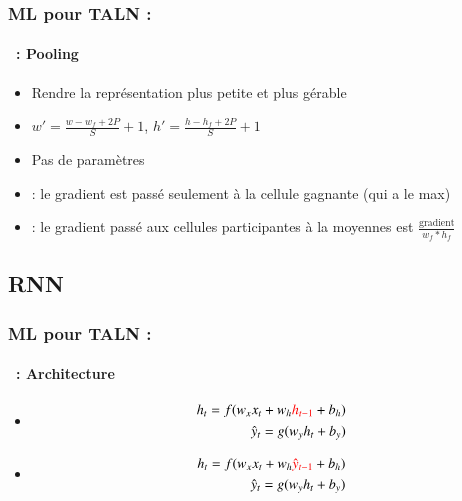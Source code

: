 \documentclass[xcolor=table]{beamer}
\begin{document}
\begin{frame}
	\frametitle{ML pour TALN : \insertsection}
	\framesubtitle{\insertsubsection\ : Pooling}
	
	\begin{minipage}{0.60\textwidth} 
		\begin{itemize}
			\item Rendre la représentation plus petite et plus gérable
			\item $ w' = \frac{w - w_f + 2P}{S} + 1$,  $ h' = \frac{h - h_f + 2P}{S} + 1$
			\item Pas de paramètres 
			\item {} : le gradient est passé seulement à la cellule gagnante (qui a le max) 
			\item {} : le gradient passé aux cellules participantes à la moyennes est $\frac{\text{gradient}}{w_f * h_f}$ 
		\end{itemize}
	\end{minipage}
	\begin{minipage}{0.39\textwidth}
	\end{minipage}
	
\end{frame}

\subsection{RNN}

\begin{frame}
	\frametitle{ML pour TALN : \insertsection}
	\framesubtitle{\insertsubsection\ : Architecture}
	
	\begin{minipage}{0.49\textwidth} 
		\begin{itemize}
			\item {}
			\begin{align*}
				h_t = f(w_x x_t + w_h \textcolor{red}{h_{t-1}} + b_h) \\
				\hat{y}_t = g(w_y h_t + b_y)
			\end{align*}
			\item {}
			\begin{align*}
				h_t = f(w_x x_t + w_h \textcolor{red}{\hat{y}_{t-1}} + b_h) \\
				\hat{y}_t = g(w_y h_t + b_y)
			\end{align*}
		\end{itemize}
	\end{minipage}
	\begin{minipage}{0.5\textwidth}
	\end{minipage}
	
\end{frame}
\end{document}
